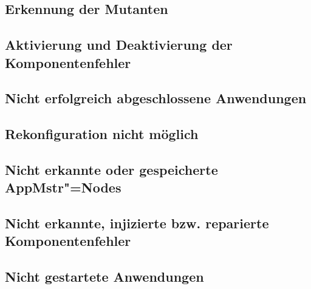 \subsection{Erkennung der Mutanten}
\label{sec:killingMutants}



\subsection{Aktivierung und Deaktivierung der Komponentenfehler}
\label{sec:faultInjectionEval}


\subsection{Nicht erfolgreich abgeschlossene Anwendungen}
\label{sec:failedAppsEval}





\subsection{Rekonfiguration nicht möglich}
\label{sec:noReconfig}






\subsection{Nicht erkannte oder gespeicherte \ac{AppMstr}"=Nodes}
\label{sec:noDetectedHost2}




\subsection{Nicht erkannte, injizierte bzw. reparierte Komponentenfehler}
\label{sec:noDetectedFault}


\subsection{Nicht gestartete Anwendungen}
\label{sec:notStartedApps}


